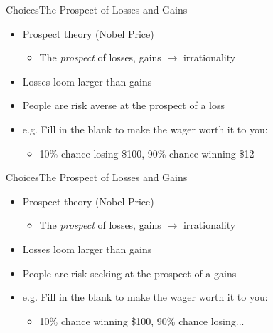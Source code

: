 \documentclass{beamer}
\begin{document}
\begin{frame}{Choices}{The Prospect of Losses and Gains}
  \begin{itemize}
  \addtolength{\itemsep}{0.5\baselineskip}
  \item Prospect theory (Nobel Price) 
        \begin{itemize}
        \item The {\it prospect} of losses, gains $\rightarrow$ irrationality
        \end{itemize}
  \item Losses loom larger than gains
  \item People are risk averse at the prospect of a loss
  \item e.g. Fill in the blank to make the wager worth it to you:
        \begin{itemize}
        \item 10\% chance losing \$100, 90\% chance winning \$12
        \end{itemize}
  \end{itemize}

\end{frame}

\begin{frame}{Choices}{The Prospect of Losses and Gains}
  \begin{itemize}
  \addtolength{\itemsep}{0.5\baselineskip}
  \item Prospect theory (Nobel Price) 
        \begin{itemize}
        \item The {\it prospect} of losses, gains $\rightarrow$ irrationality
        \end{itemize}
  \item Losses loom larger than gains
  \item People are risk seeking at the prospect of a gains
  \item e.g. Fill in the blank to make the wager worth it to you:
        \begin{itemize}
        \item 10\% chance winning \$100, 90\% chance losing...
        \end{itemize}
  \end{itemize}

\end{frame}
\end{document}
